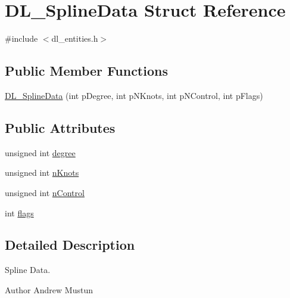 \hypertarget{structDL__SplineData}{\section{D\-L\-\_\-\-Spline\-Data Struct Reference}
\label{structDL__SplineData}
}


{\ttfamily \#include $<$dl\-\_\-entities.\-h$>$}

\subsection*{Public Member Functions}
\begin{DoxyCompactItemize}
\item 
\hyperlink{structDL__SplineData_a0a77041c2802fe6960b798df07e0968d}{D\-L\-\_\-\-Spline\-Data} (int p\-Degree, int p\-N\-Knots, int p\-N\-Control, int p\-Flags)
\end{DoxyCompactItemize}
\subsection*{Public Attributes}
\begin{DoxyCompactItemize}
\item 
unsigned int \hyperlink{structDL__SplineData_ad05cfaf9f9fa86cb711be86207d87777}{degree}
\item 
unsigned int \hyperlink{structDL__SplineData_a764349a25f826f354c91903b0b419fc3}{n\-Knots}
\item 
unsigned int \hyperlink{structDL__SplineData_af5f81bcc0e6ee55f9a020c8cc75cb261}{n\-Control}
\item 
int \hyperlink{structDL__SplineData_a176d98ad0e03d1037d410aa52eee68f6}{flags}
\end{DoxyCompactItemize}


\subsection{Detailed Description}
Spline Data.

\begin{DoxyAuthor}{Author}
Andrew Mustun 
\end{DoxyAuthor}


